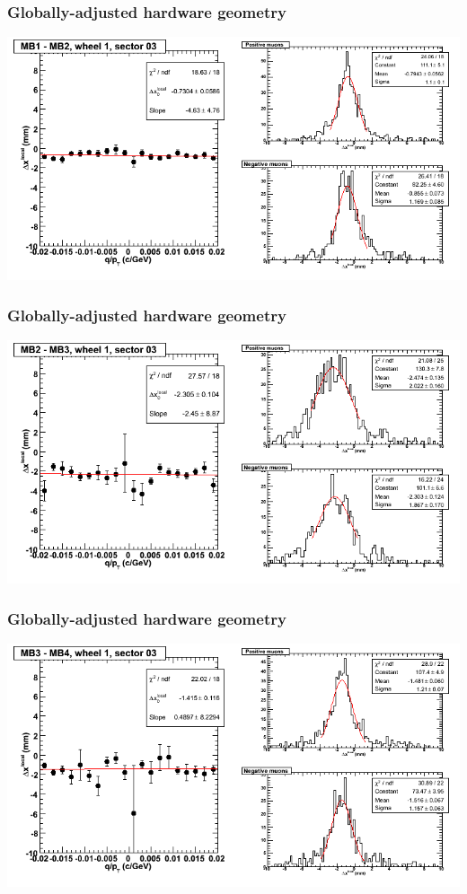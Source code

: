 \documentclass[compress]{beamer}
\begin{document}
\begin{frame}
\frametitle{Globally-adjusted hardware geometry}
\includegraphics[width=\linewidth]{NOV4_segdiffs_HW/dt13_resid_D_03_12.png}
\end{frame}

\begin{frame}
\frametitle{Globally-adjusted hardware geometry}
\includegraphics[width=\linewidth]{NOV4_segdiffs_HW/dt13_resid_D_03_23.png}
\end{frame}

\begin{frame}
\frametitle{Globally-adjusted hardware geometry}
\includegraphics[width=\linewidth]{NOV4_segdiffs_HW/dt13_resid_D_03_34.png}
\end{frame}
\end{document}
